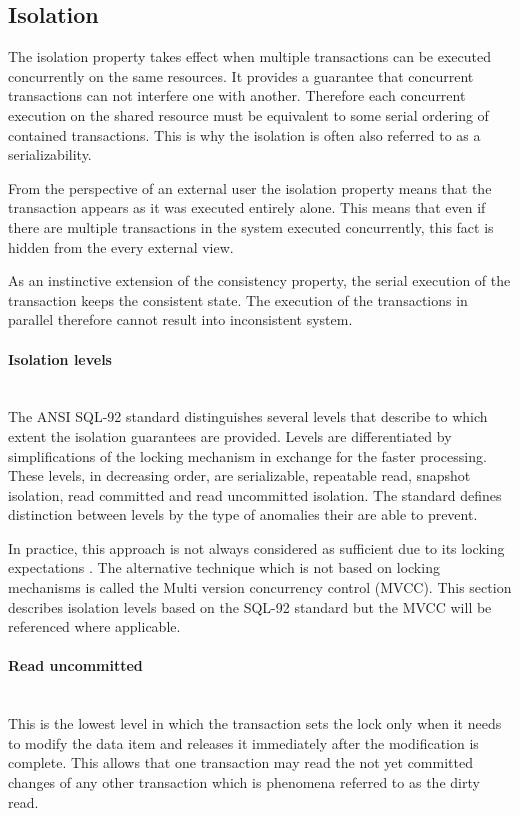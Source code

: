 \documentclass[oneside,
  digital, %
  table,   %
  nolof,     %
  nolot,     %
]{fithesis3}
\newcommand{\newlinepar}[1]{\paragraph{#1}\needspace{4\baselineskip}\mbox{}\\}
\begin{document}
\subsection{Isolation}

The isolation property takes effect when multiple transactions can be executed concurrently on the same resources. It provides a guarantee that concurrent transactions can not interfere one with another. Therefore each concurrent execution on the shared resource must be equivalent to some serial ordering of contained transactions. This is why the isolation is often also referred to as a serializability.

From the perspective of an external user the isolation property means that the transaction appears as it was executed entirely alone. This means that even if there are multiple transactions in the system executed concurrently, this fact is hidden from the every external view.

As an instinctive extension of the consistency property, the serial execution of the transaction keeps the consistent state. The execution of the transactions in parallel therefore cannot result into inconsistent system.

\newlinepar{Isolation levels}

The ANSI SQL-92 \cite{sql-92} standard distinguishes several levels that describe to which extent the isolation guarantees are provided. Levels are differentiated by simplifications of the locking mechanism in exchange for the faster processing. These levels, in decreasing order, are serializable, repeatable read, snapshot isolation, read committed and read uncommitted isolation. The standard defines distinction between levels by the type of anomalies their are able to prevent. 

In practice, this approach is not always considered as sufficient due to its locking expectations \cite{ansi-sql-critique}. The alternative technique which is not based on locking mechanisms is called the Multi version concurrency control (MVCC). This section describes isolation levels based on the SQL-92 standard but the MVCC will be referenced where applicable.

\newlinepar{Read uncommitted}

This is the lowest level in which the transaction sets the lock only when it needs to modify the data item and releases it immediately after the modification is complete. This allows that one transaction may read the not yet committed changes of any other transaction which is phenomena referred to as the dirty read.
\end{document}
